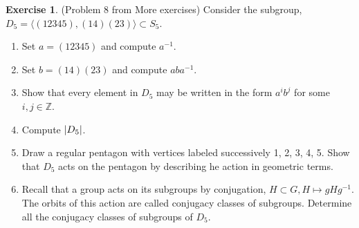 \documentclass[12pt, psamsfonts]{amsart}
\theoremstyle{definition}
\newtheorem*{exer}{Exercise}
\theoremstyle{remark}
\numberwithin{equation}{section}
\begin{document}
\begin{exer}{(Problem 8 from More exercises)}
  Consider the subgroup, $D_5 = \langle (12345), (14)(23) \rangle \subset S_5$.
  \begin{enumerate}
    \item
      Set $a = (12345)$ and compute $a^{-1}$.
    \item
      Set $b = (14)(23)$ and compute $aba^{-1}$.
    \item
      Show that every element in $D_5$ may be written in the form $a^ib^j$ for some $i, j \in \mathbb{Z}$.
    \item
      Compute $\abs{D_5}$.
    \item
      Draw a regular pentagon with vertices labeled successively 1, 2, 3, 4, 5.
      Show that $D_5$ acts on the pentagon by describing he action in geometric terms.
    \item
      Recall that a group acts on its subgroups by conjugation, $H \subset G, H \mapsto gHg^{-1}$.
      The orbits of this action are called conjugacy classes of subgroups.
      Determine all the conjugacy classes of subgroups of $D_5$.
  \end{enumerate}
\end{exer}
\end{document}
